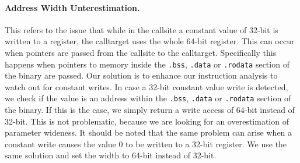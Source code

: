 \paragraph{Address Width Unterestimation.} This refers to the issue that while in the callsite a constant value of 32-bit is written to a register, the calltarget uses the 
whole 64-bit register. This can occur when pointers are passed from the callsite to the calltarget. Specifically this happens 
when pointers to memory inside the \texttt{.bss}, \texttt{.data} or \texttt{.rodata} section of the binary are passed.
Our solution is to enhance our instruction analysis to watch out for constant writes. In case a 32-bit constant value write is detected, we check if the
value is an address within the \texttt{.bss}, \texttt{.data} or \texttt{.rodata} section of the binary. If this is the case, we simply return a write access of 64-bit 
instead of 32-bit. This is not problematic, because we are looking for an overestimation of parameter wideness.
It should be noted that the same problem can arise when a constant write causes the value 0 to be written to a 32-bit register. We use the same solution
and set the width to 64-bit instead of 32-bit.
%
%
%
